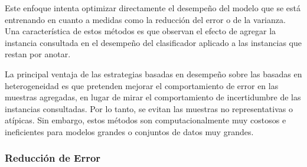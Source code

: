 Este enfoque intenta optimizar directamente el desempeño del modelo que se está entrenando en cuanto a medidas como la reducción del error o de la varianza. Una característica de
estos métodos es que observan el efecto de agregar la instancia consultada en el desempeño del clasificador aplicado a las instancias que restan por anotar. 

La principal ventaja de las estrategias basadas en desempeño sobre las basadas en heterogeneidad es que pretenden
mejorar el comportamiento de error en las muestras agregadas, en lugar de mirar el comportamiento de incertidumbre
de las instancias consultadas. Por lo tanto, se evitan las muestras no representativas o atípicas. Sin embargo, estos
métodos son computacionalmente muy costosos e ineficientes para modelos grandes o conjuntos de datos muy grandes. 





\subsubsection{Reducción de Error}


